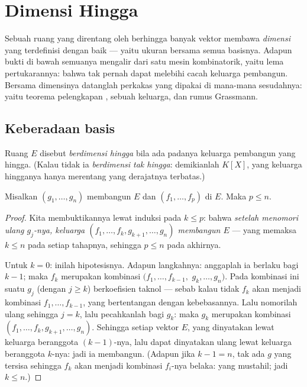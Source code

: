 \chapter{Dimensi Hingga}\label{ch:b1:findim}

Sebuah ruang yang direntang oleh berhingga banyak vektor membawa
\emph{dimensi} yang terdefinisi dengan baik --- yaitu ukuran bersama semua basisnya. Adapun bukti
di bawah semuanya mengalir dari satu mesin kombinatorik, yaitu lema pertukarannya:
bahwa  tak pernah dapat melebihi cacah keluarga pembangun. Bersama dimensinya
datanglah perkakas yang dipakai di mana-mana sesudahnya: yaitu teorema
pelengkapan ,  sebuah keluarga, dan rumus Grassmann.

\section{Keberadaan basis}

\begin{definition}\label{def:b1:findim:def}
Ruang $E$ disebut \emph{berdimensi hingga} bila ada padanya
keluarga pembangun yang hingga. (Kalau tidak ia \emph{berdimensi tak hingga}:
demikianlah $K[X]$, yang keluarga hingganya hanya merentang  yang derajatnya
terbatas.)
\end{definition}

\begin{theorem}\label{thm:b1:findim:exchange}
Misalkan $(g_1, \dots, g_n)$ membangun $E$ dan $(f_1, \dots, f_p)$ 
di $E$. Maka $p \leq n$.
\end{theorem}

\begin{proof}
Kita membuktikannya lewat induksi pada $k \leq p$: bahwa \emph{setelah menomori ulang
$g_j$-nya, keluarga $(f_1, \dots, f_k, g_{k+1}, \dots, g_n)$ membangun
$E$} --- yang memaksa $k \leq n$ pada setiap tahapnya, sehingga $p \leq n$ pada
akhirnya.

Untuk $k = 0$: inilah hipotesisnya. Adapun langkahnya: anggaplah ia berlaku bagi $k - 1$; maka $f_k$
merupakan kombinasi $(f_1, \dots, f_{k-1},$ $g_k, \dots, g_n)$. Pada
kombinasi ini suatu $g_j$ (dengan $j \geq k$) berkoefisien taknol
---
sebab kalau tidak $f_k$ akan menjadi kombinasi $f_1, \dots, f_{k-1}$,
yang bertentangan dengan kebebasannya. Lalu nomorilah ulang sehingga $j = k$, lalu pecahkanlah bagi
$g_k$: maka $g_k$ merupakan kombinasi $(f_1, \dots, f_k, g_{k+1}, \dots,
g_n)$. Sehingga setiap vektor $E$, yang dinyatakan lewat keluarga beranggota $(k-1)$-nya,
lalu dapat dinyatakan ulang lewat keluarga beranggota $k$-nya: jadi ia membangun.
(Adapun jika $k - 1 = n$, tak ada $g$ yang tersisa sehingga $f_k$ akan menjadi kombinasi
$f_i$-nya belaka: yang mustahil; jadi $k \leq n$.)
\end{proof}


